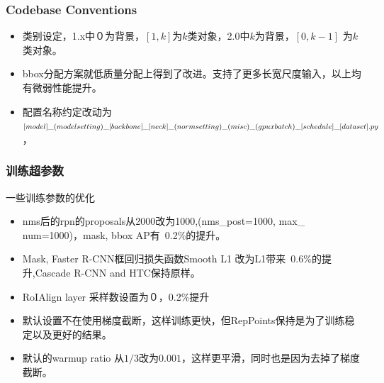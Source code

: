 \documentclass[UTF8]{ctexart}
\begin{document}
\subsubsection{Codebase Conventions}

\begin{itemize}
	\item 类别设定，1.x中０为背景，$[1, k]$为$k$类对象，2.0中$k$为背景，$[0, k-1]$ 为$k$类对象。
	\item bbox分配方案就低质量分配上得到了改进。支持了更多长宽尺度输入，以上均有微弱性能提升。
	\item 配置名称约定改动为 $[model]\_(model setting)\_[backbone]\_[neck]\_(no
	\newline
	rmsetting)\_(misc)\_(gpu x batch)\_[schedule]\_[dataset].py$，
\end{itemize}


\subsubsection{训练超参数}
一些训练参数的优化
\begin{itemize}
	\item nms后的rpn的proposals从2000改为1000,(nms\_post=1000, max\_
	num=1000)，mask, bbox AP有~0.2\%的提升。
	\item Mask, Faster R-CNN框回归损失函数Smooth L1 改为L1带来~0.6\%的提升,Cascade R-CNN and HTC保持原样。
	\item RoIAlign layer 采样数设置为０，0.2\%提升
	\item 默认设置不在使用梯度截断，这样训练更快，但RepPoints保持是为了训练稳定以及更好的结果。
	\item 默认的warmup ratio 从$1/3$改为$0.001$，这样更平滑，同时也是因为去掉了梯度截断。
\end{itemize}
\end{document}
